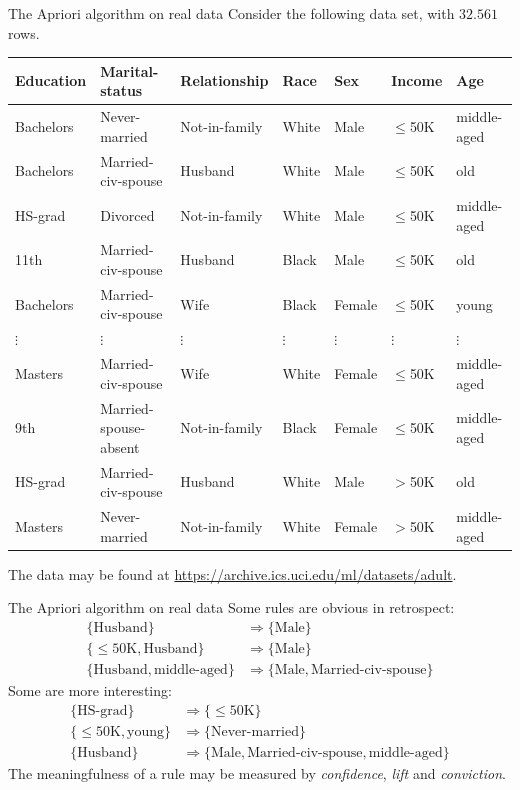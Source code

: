 \documentclass[12pt, aspectratio=1610]{beamer}
\theoremstyle{plain}
\begin{document}
\begin{frame}[fragile]{The Apriori algorithm on real data}
	Consider the following data set, with $32.561$ rows.
	\vfill
	
	{\footnotesize 
	\begin{tabular}{lllllll}
		\toprule
Education & Marital-status & Relationship & Race & Sex & Income & Age \\
\midrule Bachelors &  Never-married &  Not-in-family &  White &  Male &  $\leq$50K & middle-aged \\
Bachelors &  Married-civ-spouse &  Husband &  White &  Male &  $\leq$50K & old \\
HS-grad &  Divorced &  Not-in-family &  White &  Male &  $\leq$50K & middle-aged \\
11th &  Married-civ-spouse &  Husband &  Black &  Male &  $\leq$50K & old \\
Bachelors &  Married-civ-spouse &  Wife &  Black &  Female &  $\leq$50K & young \\
$\vdots$ &  $\vdots$  & $\vdots$  &  $\vdots$  &  $\vdots$  &  $\vdots$  & $\vdots$  \\
Masters &  Married-civ-spouse &  Wife &  White &  Female &  $\leq$50K & middle-aged \\
9th &  Married-spouse-absent &  Not-in-family &  Black &  Female &  $\leq$50K & middle-aged \\
HS-grad &  Married-civ-spouse &  Husband &  White &  Male &  $>$50K & old \\
Masters &  Never-married &  Not-in-family &  White &  Female &  $>$50K & middle-aged \\

\bottomrule
	\end{tabular}
}
	\vfill
	
	{\footnotesize The data may be found at \url{https://archive.ics.uci.edu/ml/datasets/adult}.}
\end{frame}

\begin{frame}[fragile]{The Apriori algorithm on real data}
	Some rules are obvious in retrospect:
	\begin{align*}
		\{ \text{Husband} \} &\Rightarrow \{ \text{Male} \} \\
		\{ \leq \text{50K}, \text{Husband} \} &\Rightarrow \{ \text{Male} \} \\
		\{ \text{Husband}, \text{middle-aged} \} &\Rightarrow \{ \text{Male}, \text{Married-civ-spouse} \}
	\end{align*}
	Some are more interesting:
	\begin{align*}
	\{ \text{HS-grad} \} &\Rightarrow \{ \leq \text{50K} \} \\
	\{ \leq \text{50K}, \text{young} \} &\Rightarrow \{  \text{Never-married} \} \\
	\{ \text{Husband} \} &\Rightarrow \{ \text{Male}, \text{Married-civ-spouse}, \text{middle-aged}  \}
	\end{align*}
	The meaningfulness of a rule may be measured by \emph{confidence}, \emph{lift} and \emph{conviction}.
\end{frame}
\end{document}
